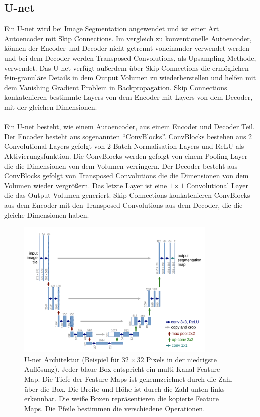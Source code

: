 \subsection{U-net}
Ein U-net wird bei Image Segmentation angewendet und ist einer Art Autoencoder mit Skip Connections. Im vergleich zu konventionelle Autoencoder, können
der Encoder und Decoder nicht getrennt voneinander verwendet werden und bei dem Decoder werden Transposed Convolutions, als Upsampling 
Methode, verwendet. Das U-net verfügt außerdem über Skip Connections die ermöglichen fein-granuläre Details in dem Output Volumen zu 
wiederherstellen und helfen mit dem Vanishing Gradient Problem in Backpropagation. Skip Connections konkatenieren bestimmte Layers von dem
Encoder mit Layers von dem Decoder, mit der gleichen Dimensionen.
\\
\\
Ein U-net besteht, wie einem Autoencoder, aus einem Encoder und Decoder Teil. Der Encoder besteht aus sogenannten ``ConvBlocks''. ConvBlocks
bestehen aus 2 Convolutional Layers gefolgt von 2 Batch Normalisation Layers und ReLU als Aktivierungsfunktion. Die ConvBlocks werden gefolgt
von einem Pooling Layer die die Dimensionen von dem Volumen verringern. Der Decoder besteht aus ConvBlocks gefolgt von Transposed Convolutions
die die Dimensionen von dem Volumen wieder vergrößern. Das letzte Layer ist eine $1 \times 1$ Convolutional Layer die das Output Volumen generiert.
Skip Connections konkatenieren ConvBlocks aus dem Encoder mit den Transposed Convolutions aus dem Decoder, die die gleiche Dimensionen haben.

\begin{figure}[H]
  \centering
  \includegraphics[width=0.85\textwidth]{resources/networks/unet.png}
  \caption{
    U-net Architektur (Beispiel für $32 \times 32$ Pixels in der niedrigste Auflösung). Jeder blaue Box entspricht ein multi-Kanal Feature Map.
    Die Tiefe der Feature Maps ist gekennzeichnet durch die Zahl über die Box. Die Breite und Höhe ist durch die Zahl unten links erkennbar.
    Die weiße Boxen repräsentieren die kopierte Feature Maps. Die Pfeile bestimmen die verschiedene Operationen.
    \cite{ronneberger2015unet}
  }
  \label{image:unet}
\end{figure}

